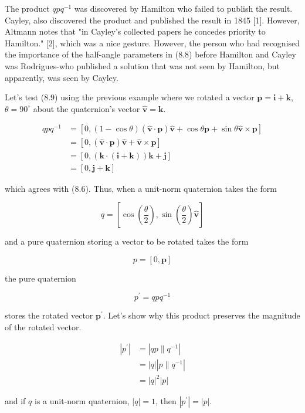 \documentclass[10pt]{article}
\begin{document}
The product $q p q^{-1}$ was discovered by Hamilton who failed to publish the result. Cayley, also discovered the product and published the result in 1845 [1]. However, Altmann notes that "in Cayley's collected papers he concedes priority to Hamilton." [2], which was a nice gesture. However, the person who had recognised the importance of the half-angle parameters in (8.8) before Hamilton and Cayley was Rodrigues-who published a solution that was not seen by Hamilton, but apparently, was seen by Cayley.

Let's test (8.9) using the previous example where we rotated a vector $\mathbf{p}=\mathbf{i}+\mathbf{k}$, $\theta=90^{\circ}$ about the quaternion's vector $\hat{\mathbf{v}}=\mathbf{k}$.

$$
\begin{aligned}
q p q^{-1} & =[0,(1-\cos \theta)(\hat{\mathbf{v}} \cdot \mathbf{p}) \hat{\mathbf{v}}+\cos \theta \mathbf{p}+\sin \theta \hat{\mathbf{v}} \times \mathbf{p}] \\
& =[0,(\hat{\mathbf{v}} \cdot \mathbf{p}) \hat{\mathbf{v}}+\hat{\mathbf{v}} \times \mathbf{p}] \\
& =[0,(\mathbf{k} \cdot(\mathbf{i}+\mathbf{k})) \mathbf{k}+\mathbf{j}] \\
& =[0, \mathbf{j}+\mathbf{k}]
\end{aligned}
$$

which agrees with (8.6). Thus, when a unit-norm quaternion takes the form

$$
q=\left[\cos \left(\frac{\theta}{2}\right), \sin \left(\frac{\theta}{2}\right) \hat{\mathbf{v}}\right]
$$

and a pure quaternion storing a vector to be rotated takes the form

$$
p=[0, \mathbf{p}]
$$

the pure quaternion

$$
p^{\prime}=q p q^{-1}
$$

stores the rotated vector $\mathbf{p}^{\prime}$. Let's show why this product preserves the magnitude of the rotated vector.

$$
\begin{aligned}
\left|p^{\prime}\right| & =\left|q p \| q^{-1}\right| \\
& =|q|\left|p \| q^{-1}\right| \\
& =|q|^{2}|p|
\end{aligned}
$$

and if $q$ is a unit-norm quaternion, $|q|=1$, then $\left|p^{\prime}\right|=|p|$.
\end{document}
